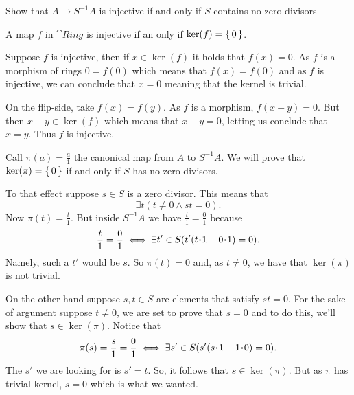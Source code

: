 \documentclass[12pt]{memoir}
\begin{document}
    \begin{Ej}[1.3.C]
        Show that $A\to S^{-1}A$ is injective if and only if $S$ contains no
        zero divisors
    \end{Ej}
    
    \begin{Lem}
    A map $f$ in $\cat{Ring}$ is injective if an only if $\ker(f)=\{\,0\,\}$.
    \end{Lem}
    
    \begin{ptcbp}
    Suppose $f$ is injective, then if $x\in\ker(f)$ it holds that $f(x)=0$. As $f$ is a morphism of rings $0=f(0)$ which means that $f(x)=f(0)$ and as $f$ is injective, we can conclude that $x=0$ meaning that the kernel is trivial.\par 
    On the flip-side, take $f(x)=f(y)$. As $f$ is a morphism, $f(x-y)=0$. But then $x-y\in\ker(f)$ which means that $x-y=0$, letting us conclude that $x=y$. Thus $f$ is injective.
    \end{ptcbp}
    
    \begin{ptcbr}
    Call $\pi(a)=\frac{a}{1}$ the canonical map from $A$ to $S^{-1}A$. We will prove that $\ker(\pi)=\{\,0\,\}$ if and only if $S$ has no zero divisors. \par 
    To that effect suppose $s\in S$ is a zero divisor. This means that 
    $$\exists t (t\neq 0\land st=0).$$
    Now $\pi(t)=\frac{t}{1}$. But inside $S^{-1}A$ we have $\frac{t}{1}=\frac{0}{1}$ because 
    $$\frac{t}{1}=\frac{0}{1}\iff \exists t'\in S(t'(t\.1-0\.1)=0).$$
    Namely, such a $t'$ would be $s$. So $\pi(t)=0$ and, as $t\neq 0$, we have that $\ker(\pi)$ is not trivial.\par 
    On the other hand suppose $s,t\in S$ are elements that satisfy $st=0$. For the sake of argument suppose $t\neq 0$, we are set to prove that $s=0$ and to do this, we'll show that $s\in\ker(\pi)$. Notice that 
    $$\pi(s)=\frac{s}{1}=\frac{0}{1}\iff \exists s'\in S(s'(s\.1-1\.0)=0).$$
    The $s'$ we are looking for is $s'=t$. So, it follows that $s\in\ker(\pi)$. But as $\pi$ has trivial kernel, $s=0$ which is what we wanted. 
    \end{ptcbr}
\end{document}
